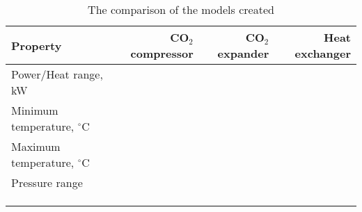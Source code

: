 \begin{table}
\label{tab:DiscussionComparison}
\caption{The comparison of the models created}
\begin{center}
\begin{tabulary}{0.9\textwidth}{LRRR}
\toprule
Property 	&	CO$_2$ compressor & CO$_2$	expander & Heat exchanger \\
\midrule
Power/Heat range, kW& & & \\
Minimum temperature, $^\circ$C& & & \\
Maximum temperature, $^\circ$C& & & \\
Pressure range& & & \\
& & & \\
& & & \\
& & & \\
\bottomrule
\end{tabulary}
\end{center}
\end{table}